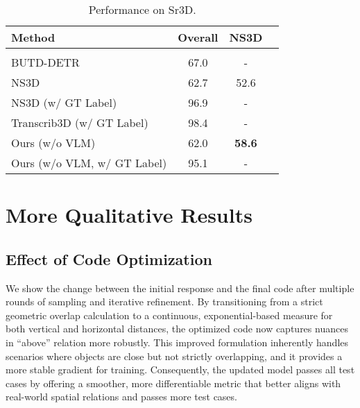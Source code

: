 \begin{table*}[t]
\centering
\caption{Performance on Sr3D.}
\begin{center}
\label{tab:sr3d}
\begin{tabular}{lccc}
\hline
\multicolumn{1}{l}{Method}  &\multicolumn{1}{c}{\bf Overall}   &\multicolumn{1}{c}{\bf NS3D} 
\\ \hline \\
BUTD-DETR& 67.0  & -\\ 
NS3D \citep{hsu2023ns3d} & 62.7 & 52.6\\ 
NS3D \citep{hsu2023ns3d} (w/ GT Label) & 96.9  & -\\ 
Transcrib3D \citep{fang2024transcrib3d} (w/ GT Label) & 98.4 & -\\
Ours (w/o VLM)& 62.0  & \textbf{58.6}\\ 
Ours (w/o VLM, w/ GT Label) & 95.1 & -\\
\hline
\end{tabular}
\end{center}
\end{table*}


\section{More Qualitative Results}
\subsection{Effect of Code Optimization}
We show the change between the initial response and the final code after multiple rounds of sampling and iterative refinement. By transitioning from a strict geometric overlap calculation to a continuous, exponential-based measure for both vertical and horizontal distances, the optimized code now captures nuances in ``above'' relation more robustly. This improved formulation inherently handles scenarios where objects are close but not strictly overlapping, and it provides a more stable gradient for training. Consequently, the updated model passes all test cases by offering a smoother, more differentiable metric that better aligns with real-world spatial relations and passes more test cases.

